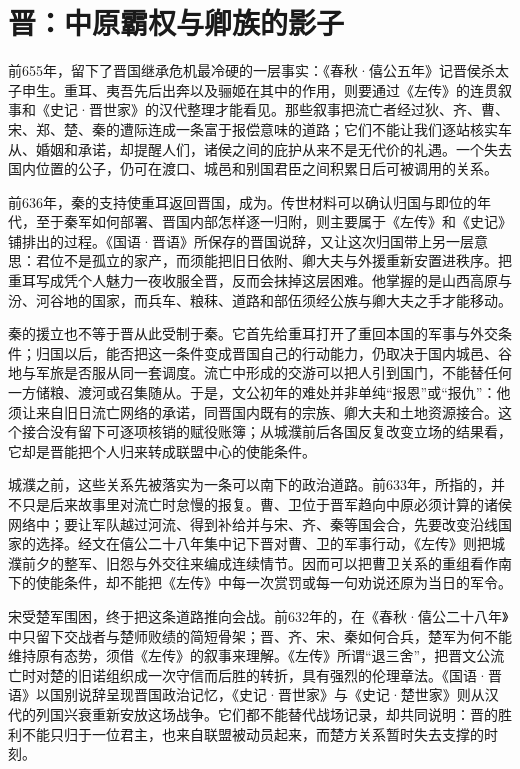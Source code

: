 \section{晋：中原霸权与卿族的影子}

前655年，留下了晋国继承危机最冷硬的一层事实：《春秋·僖公五年》记晋侯杀太子申生。重耳、夷吾先后出奔以及骊姬在其中的作用，则要通过《左传》的连贯叙事和《史记·晋世家》的汉代整理才能看见。那些叙事把流亡者经过狄、齐、曹、宋、郑、楚、秦的遭际连成一条富于报偿意味的道路；它们不能让我们逐站核实车从、婚姻和承诺，却提醒人们，诸侯之间的庇护从来不是无代价的礼遇。一个失去国内位置的公子，仍可在渡口、城邑和别国君臣之间积累日后可被调用的关系。

前636年，秦的支持使重耳返回晋国，成为。传世材料可以确认归国与即位的年代，至于秦军如何部署、晋国内部怎样逐一归附，则主要属于《左传》和《史记》铺排出的过程。《国语·晋语》所保存的晋国说辞，又让这次归国带上另一层意思：君位不是孤立的家产，而须能把旧日依附、卿大夫与外援重新安置进秩序。把重耳写成凭个人魅力一夜收服全晋，反而会抹掉这层困难。他掌握的是山西高原与汾、河谷地的国家，而兵车、粮秣、道路和部伍须经公族与卿大夫之手才能移动。

秦的援立也不等于晋从此受制于秦。它首先给重耳打开了重回本国的军事与外交条件；归国以后，能否把这一条件变成晋国自己的行动能力，仍取决于国内城邑、谷地与军旅是否服从同一套调度。流亡中形成的交游可以把人引到国门，不能替任何一方储粮、渡河或召集随从。于是，文公初年的难处并非单纯“报恩”或“报仇”：他须让来自旧日流亡网络的承诺，同晋国内既有的宗族、卿大夫和土地资源接合。这个接合没有留下可逐项核销的赋役账簿；从城濮前后各国反复改变立场的结果看，它却是晋能把个人归来转成联盟中心的使能条件。

城濮之前，这些关系先被落实为一条可以南下的政治道路。前633年，所指的，并不只是后来故事里对流亡时怠慢的报复。曹、卫位于晋军趋向中原必须计算的诸侯网络中；要让军队越过河流、得到补给并与宋、齐、秦等国会合，先要改变沿线国家的选择。经文在僖公二十八年集中记下晋对曹、卫的军事行动，《左传》则把城濮前夕的整军、旧怨与外交往来编成连续情节。因而可以把曹卫关系的重组看作南下的使能条件，却不能把《左传》中每一次赏罚或每一句劝说还原为当日的军令。

宋受楚军围困，终于把这条道路推向会战。前632年的，在《春秋·僖公二十八年》中只留下交战者与楚师败绩的简短骨架；晋、齐、宋、秦如何合兵，楚军为何不能维持原有态势，须借《左传》的叙事来理解。《左传》所谓“退三舍”，把晋文公流亡时对楚的旧诺组织成一次守信而后胜的转折，具有强烈的伦理章法。《国语·晋语》以国别说辞呈现晋国政治记忆，《史记·晋世家》与《史记·楚世家》则从汉代的列国兴衰重新安放这场战争。它们都不能替代战场记录，却共同说明：晋的胜利不能只归于一位君主，也来自联盟被动员起来，而楚方关系暂时失去支撑的时刻。

